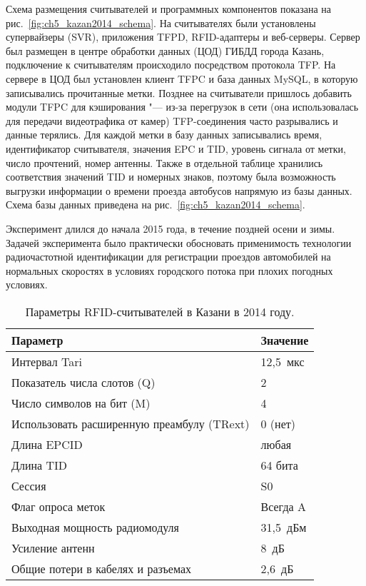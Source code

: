 Схема размещения считывателей и программных компонентов показана на рис.~\ref{fig:ch5_kazan2014_schema}. На считывателях были установлены супервайзеры (SVR), приложения TFPD, RFID-адаптеры и веб-серверы. Сервер был размещен в центре обработки данных (ЦОД) ГИБДД города Казань, подключение к считывателям происходило посредством протокола TFP.  На сервере в ЦОД был установлен клиент TFPC и база данных MySQL, в которую записывались прочитанные метки. Позднее на считыватели пришлось добавить модули TFPC для кэширования "--- из-за перегрузок в сети (она использовалась для передачи видеотрафика от камер) TFP-соединения часто разрывались и данные терялись. Для каждой метки в базу данных записывались время, идентификатор считывателя, значения EPC и TID, уровень сигнала от метки, число прочтений, номер антенны. Также в отдельной таблице хранились соответствия значений TID и номерных знаков, поэтому была возможность выгрузки информации о времени проезда автобусов напрямую из базы данных. Схема базы данных приведена на рис.~\ref{fig:ch5_kazan2014_schema}.

Эксперимент длился до начала 2015 года, в течение поздней осени и зимы. Задачей эксперимента было практически обосновать применимость технологии радиочастотной идентификации для регистрации проездов автомобилей на нормальных скоростях в условиях городского потока при плохих погодных условиях.

\begin{table}[!t]
	\renewcommand{\arraystretch}{1.3}
	\caption{Параметры RFID-считывателей в Казани в 2014 году.}
	\label{table:ch5_kazan_rfid_settings}
	\centering
	\begin{tabular}{|l|l|}
		\hline
		Параметр                                   & Значение   \\\hline
		Интервал Tari                              & 12,5~мкс   \\\hline
		Показатель числа слотов (Q)                & 2          \\\hline
		Число символов на бит (M)                  & 4          \\\hline
		Использовать расширенную преамбулу (TRext) & 0 (нет)    \\\hline
		Длина EPCID                                & любая      \\\hline
		Длина TID                                  & 64 бита    \\\hline
		Сессия                                     & S0         \\\hline
		Флаг опроса меток                          & Всегда A   \\\hline
    Выходная мощность радиомодуля              & 31,5~дБм   \\\hline
    Усиление антенн                            & 8~дБ       \\\hline
    Общие потери в кабелях и разъемах          & 2,6~дБ     \\\hline
	\end{tabular}
\end{table}

